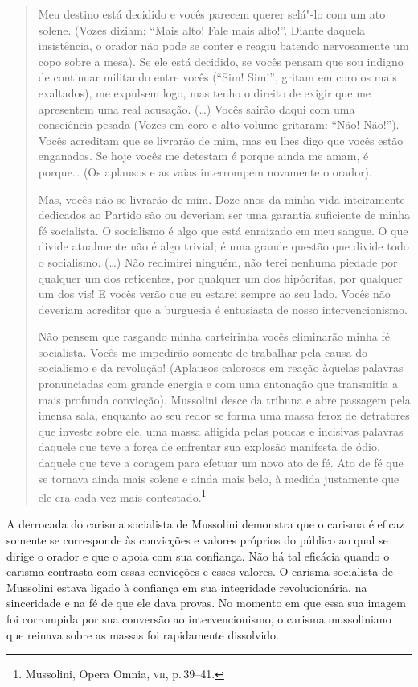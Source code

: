\begin{quote}
Meu destino está decidido e vocês parecem querer selá"-lo com um ato
solene. (Vozes diziam: ``Mais alto! Fale mais alto!''. Diante daquela
insistência, o orador não pode se conter e reagiu batendo nervosamente
um copo sobre a mesa). Se ele está decidido, se vocês pensam que sou
indigno de continuar militando entre vocês (``Sim! Sim!'', gritam em
coro os mais exaltados), me expulsem logo, mas tenho o direito de exigir
que me apresentem uma real acusação. (\ldots{}) Vocês sairão daqui com uma
consciência pesada (Vozes em coro e alto volume gritaram: ``Não!
Não!''). Vocês acreditam que se livrarão de mim, mas eu lhes digo que
vocês estão enganados. Se hoje vocês me detestam é porque ainda me amam,
é porque\ldots{} (Os aplausos e as vaias interrompem novamente o orador).

Mas, vocês não se livrarão de mim. Doze anos da minha vida inteiramente
dedicados ao Partido são ou deveriam ser uma garantia suficiente de
minha fé socialista. O socialismo é algo que está enraizado em meu
sangue. O que divide atualmente não é algo trivial; é uma grande questão
que divide todo o socialismo. (\ldots{}) Não redimirei ninguém, não terei
nenhuma piedade por qualquer um dos reticentes, por qualquer um dos
hipócritas, por qualquer um dos vis! E vocês verão que eu estarei sempre
ao seu lado. Vocês não deveriam acreditar que a burguesia é entusiasta
de nosso intervencionismo.

Não pensem que rasgando minha carteirinha vocês eliminarão minha fé
socialista. Vocês me impedirão somente de trabalhar pela causa do
socialismo e da revolução! (Aplausos calorosos em reação àquelas
palavras pronunciadas com grande energia e com uma entonação que
transmitia a mais profunda convicção). Mussolini desce da tribuna e abre
passagem pela imensa sala, enquanto ao seu redor se forma uma massa
feroz de detratores que investe sobre ele, uma massa afligida pelas
poucas e incisivas palavras daquele que teve a força de enfrentar sua
explosão manifesta de ódio, daquele que teve a coragem para efetuar um
novo ato de fé. Ato de fé que se tornava ainda mais solene e ainda mais
belo, à medida justamente que ele era cada vez mais
contestado.\footnote{Mussolini, Opera Omnia, \textsc{vii}, p.\,39--41.}
\end{quote}

A derrocada do carisma socialista de Mussolini demonstra que o carisma é
eficaz somente se corresponde às convicções e valores próprios do
público ao qual se dirige o orador e que o apoia com sua confiança. Não
há tal eficácia quando o carisma contrasta com essas convicções e esses
valores. O carisma socialista de Mussolini estava ligado à confiança em
sua integridade revolucionária, na sinceridade e na fé de que ele dava
provas. No momento em que essa sua imagem foi corrompida por sua
conversão ao intervencionismo, o carisma mussoliniano que reinava sobre
as massas foi rapidamente dissolvido.

